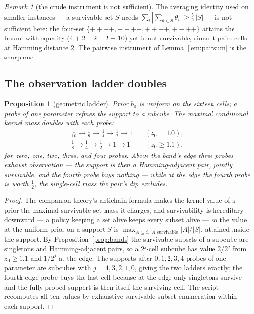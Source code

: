 \documentclass[10pt,twocolumn]{article}
\theoremstyle{plain}
\newtheorem{proposition}[theorem]{Proposition}
\theoremstyle{definition}
\theoremstyle{remark}
\newtheorem{remark}[theorem]{Remark}
\begin{document}
\begin{remark}[the crude instrument is not sufficient]
\label{rem:crude}
The averaging identity used on smaller instances --- a survivable set
\(S\) needs \(\sum_{i} |\sum_{\theta \in S} \theta_{i}| \ge
\tfrac52\,|S|\) --- is not sufficient here: the four-set
\(\{++++, +++-, ++-+, +-++\}\) attains the bound with equality
(\(4 + 2 + 2 + 2 = 10\)) yet is not survivable, since it pairs cells
at Hamming distance \(2\). The pairwise instrument of
Lemma~\ref{lem:pairsum} is the sharp one.
\end{remark}

\subsection{The observation ladder doubles}\label{ladder}

\begin{proposition}[geometric ladder]\label{prop:ladder}
Prior \(b_{0}\) is uniform on the sixteen cells; a probe of one
parameter refines the support to a subcube. The maximal conditional
kernel mass doubles with each probe:
\begin{align*}
\tfrac1{16} \to \tfrac18 \to \tfrac14 \to \tfrac12 \to 1
&\quad (z_{0} = 1.0),\\
\tfrac18 \to \tfrac14 \to \tfrac12 \to 1 \to 1
&\quad (z_{0} \ge 1.1),
\end{align*}
for zero, one, two, three, and four probes. Above the band's edge
three probes exhaust observation --- the support is then a
Hamming-adjacent pair, jointly survivable, and the fourth probe buys
nothing --- while at the edge the fourth probe is worth
\(\tfrac12\), the single-cell mass the pair's dip excludes.
\end{proposition}

\begin{proof}
The companion theory's antichain formula makes the kernel value of a
prior the maximal survivable-set mass it charges, and survivability is
hereditary downward --- a policy keeping a set alive keeps every
subset alive --- so the value at the uniform prior on a support
\(S\) is \(\max_{A \subseteq S,\ A
\text{ survivable}} |A|/|S|\), attained inside the support. By
Proposition~\ref{prop:bands} the survivable subsets of a subcube are
singletons and Hamming-adjacent pairs, so a \(2^{j}\)-cell subcube
has value \(2/2^{j}\) from \(z_{0} \ge 1.1\) and \(1/2^{j}\) at
the edge. The supports after \(0, 1, 2, 3, 4\) probes of one
parameter are subcubes with \(j = 4, 3, 2, 1, 0\), giving the two
ladders exactly; the fourth edge probe buys the last cell because at
the edge only singletons survive and the fully probed support is then
itself the surviving cell. The script recomputes all ten values by
exhaustive survivable-subset enumeration within each support.
\end{proof}
\end{document}
